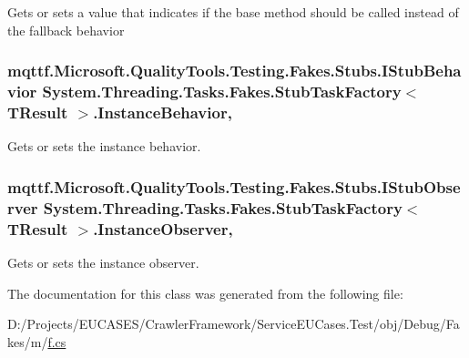 Gets or sets a value that indicates if the base method should be called instead of the fallback behavior

\hypertarget{class_system_1_1_threading_1_1_tasks_1_1_fakes_1_1_stub_task_factory_3_01_t_result_01_4_aa6b24f533333ccbc104264c0c5e5c1d5}{
\subsubsection[{Instance\-Behavior}]{\setlength{\rightskip}{0pt plus 5cm}mqttf.\-Microsoft.\-Quality\-Tools.\-Testing.\-Fakes.\-Stubs.\-I\-Stub\-Behavior {\bf System.\-Threading.\-Tasks.\-Fakes.\-Stub\-Task\-Factory}$<$ T\-Result $>$.Instance\-Behavior\hspace{0.3cm}{\ttfamily [get]}, {\ttfamily [set]}}}\label{class_system_1_1_threading_1_1_tasks_1_1_fakes_1_1_stub_task_factory_3_01_t_result_01_4_aa6b24f533333ccbc104264c0c5e5c1d5}


Gets or sets the instance behavior.

\hypertarget{class_system_1_1_threading_1_1_tasks_1_1_fakes_1_1_stub_task_factory_3_01_t_result_01_4_ace7ea01986013c65b500194b97bcdd1e}{
\subsubsection[{Instance\-Observer}]{\setlength{\rightskip}{0pt plus 5cm}mqttf.\-Microsoft.\-Quality\-Tools.\-Testing.\-Fakes.\-Stubs.\-I\-Stub\-Observer {\bf System.\-Threading.\-Tasks.\-Fakes.\-Stub\-Task\-Factory}$<$ T\-Result $>$.Instance\-Observer\hspace{0.3cm}{\ttfamily [get]}, {\ttfamily [set]}}}\label{class_system_1_1_threading_1_1_tasks_1_1_fakes_1_1_stub_task_factory_3_01_t_result_01_4_ace7ea01986013c65b500194b97bcdd1e}


Gets or sets the instance observer.



The documentation for this class was generated from the following file\-:\begin{DoxyCompactItemize}
\item 
D\-:/\-Projects/\-E\-U\-C\-A\-S\-E\-S/\-Crawler\-Framework/\-Service\-E\-U\-Cases.\-Test/obj/\-Debug/\-Fakes/m/\hyperlink{m_2f_8cs}{f.\-cs}\end{DoxyCompactItemize}
